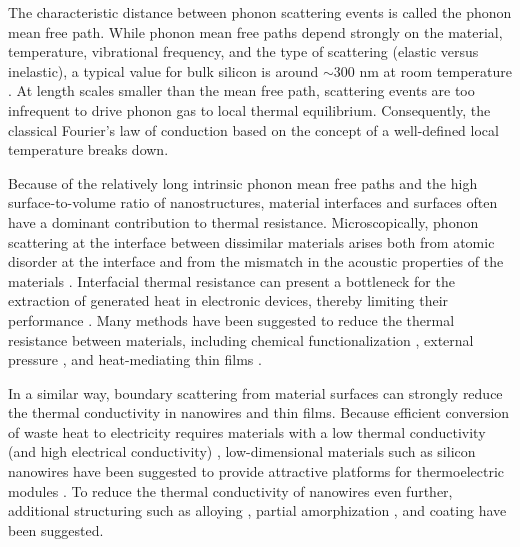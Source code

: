 The characteristic distance between phonon scattering events is called the phonon mean free path. While phonon mean free paths depend strongly on the material, temperature, vibrational frequency, and the type of scattering (elastic versus inelastic), a typical value for bulk silicon is around $\sim 300$ nm at room temperature \cite{ju99}. At length scales smaller than the mean free path, scattering events are too infrequent to drive phonon gas to local thermal equilibrium. Consequently, the classical Fourier's law of conduction \cite{fourier} based on the concept of a well-defined local temperature breaks down. 

Because of the relatively long intrinsic phonon mean free paths and the high surface-to-volume ratio of nanostructures, material interfaces and surfaces often have a dominant contribution to thermal resistance. Microscopically, phonon scattering at the interface between dissimilar materials arises both from atomic disorder at the interface and from the mismatch in the acoustic properties of the materials \cite{khalatnikov52}. Interfacial thermal resistance can present a bottleneck for the extraction of generated heat in electronic devices, thereby limiting their performance \cite{pop10,moore14}. Many methods have been suggested to reduce the thermal resistance between materials, including chemical functionalization \cite{hopkins11,kaur14,han15b}, external pressure \cite{shen11,chalopin12}, and heat-mediating thin films \cite{english12}. 

In a similar way, boundary scattering from material surfaces can strongly reduce the thermal conductivity in nanowires and thin films. Because efficient conversion of waste heat to electricity requires materials with a low thermal conductivity (and high electrical conductivity) \cite{chen}, low-dimensional materials such as silicon nanowires have been suggested to provide attractive platforms for thermoelectric modules \cite{hochbaum08,boukai08}. To reduce the thermal conductivity of nanowires even further, additional structuring such as alloying \cite{garg11}, partial amorphization \cite{donadio09}, and coating \cite{hu11} have been suggested.


